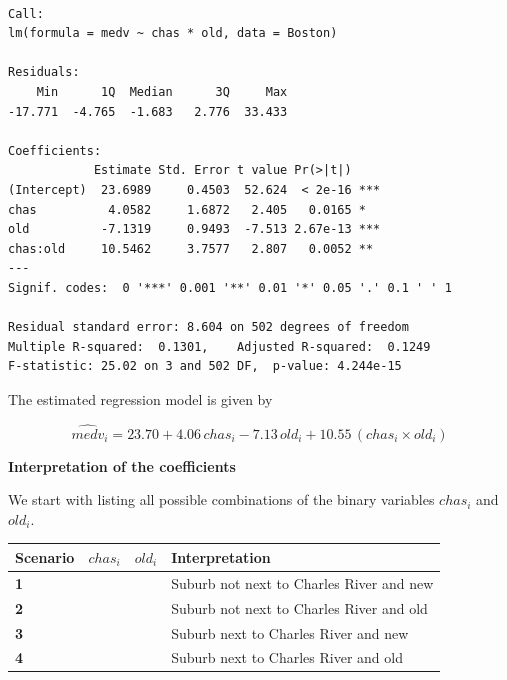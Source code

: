 \documentclass[
  12pt,
  letterpaper,
]{scrbook}
\theoremstyle{plain}
\theoremstyle{definition}
\theoremstyle{remark}
\begin{document}
\begin{verbatim}

Call:
lm(formula = medv ~ chas * old, data = Boston)

Residuals:
    Min      1Q  Median      3Q     Max 
-17.771  -4.765  -1.683   2.776  33.433 

Coefficients:
            Estimate Std. Error t value Pr(>|t|)    
(Intercept)  23.6989     0.4503  52.624  < 2e-16 ***
chas          4.0582     1.6872   2.405   0.0165 *  
old          -7.1319     0.9493  -7.513 2.67e-13 ***
chas:old     10.5462     3.7577   2.807   0.0052 ** 
---
Signif. codes:  0 '***' 0.001 '**' 0.01 '*' 0.05 '.' 0.1 ' ' 1

Residual standard error: 8.604 on 502 degrees of freedom
Multiple R-squared:  0.1301,    Adjusted R-squared:  0.1249 
F-statistic: 25.02 on 3 and 502 DF,  p-value: 4.244e-15
\end{verbatim}

The estimated regression model is given by

\[
\widehat{medv}_i = 23.70 + 4.06\, chas_i - 7.13\, old_i + 10.55\, (chas_i \times old_i)
\]

{\textbf{Interpretation of the coefficients}}

We start with listing all possible combinations of the binary variables
\(chas_i\) and \(old_i\).

\begin{longtable}[]{@{}
  >{\raggedright\arraybackslash}p{}
  >{\raggedright\arraybackslash}p{}
  >{\raggedright\arraybackslash}p{}
  >{\raggedright\arraybackslash}p{}@{}}
\toprule\noalign{}
\begin{minipage}[b]{\linewidth}\raggedright
Scenario
\end{minipage} & \begin{minipage}[b]{\linewidth}\raggedright
\(chas_i\)
\end{minipage} & \begin{minipage}[b]{\linewidth}\raggedright
\(old_i\)
\end{minipage} & \begin{minipage}[b]{\linewidth}\raggedright
Interpretation
\end{minipage} \\
\midrule\noalign{}
\endhead
\bottomrule\noalign{}
\endlastfoot
\textbf{1} & 0 & 0 & Suburb not next to Charles River and new \\
\textbf{2} & 0 & 1 & Suburb not next to Charles River and old \\
\textbf{3} & 1 & 0 & Suburb next to Charles River and new \\
\textbf{4} & 1 & 1 & Suburb next to Charles River and old \\
\end{longtable}
\end{document}
